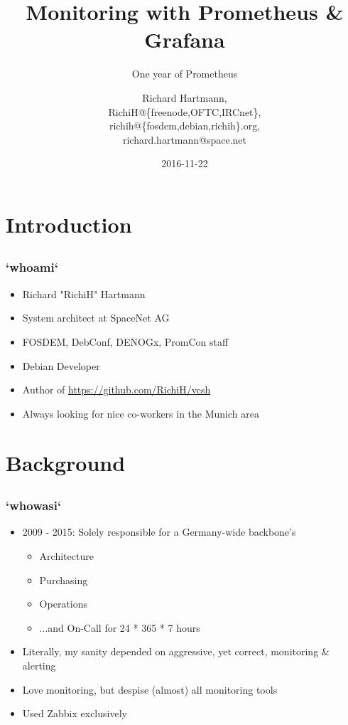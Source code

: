 \documentclass[t]{beamer}
\title{Monitoring with Prometheus \& Grafana}
\subtitle{One year of Prometheus}
\author{Richard Hartmann,\\
RichiH@\{freenode,OFTC,IRCnet\},\\
richih@\{fosdem,debian,richih\}.org,\\
richard.hartmann@space.net}
\date{2016-11-22}
\begin{document}
\setcounter{tocdepth}{1}

\begin{frame}
	\titlepage
\end{frame}


\section{Introduction}

\subsection{}

\begin{frame}
	\frametitle{`whoami`}
	\begin{itemize}
		\item Richard "RichiH" Hartmann
		\item System architect at SpaceNet AG
		\item FOSDEM, DebConf, DENOGx, PromCon staff
		\item Debian Developer
		\item Author of \url{https://github.com/RichiH/vcsh}
		\item Always looking for nice co-workers in the Munich area
	\end{itemize}
\end{frame}


\section{Background}

\subsection{}

\begin{frame}
	\frametitle{`whowasi`}
	\begin{itemize}
		\item 2009 - 2015: Solely responsible for a Germany-wide backbone's
		\begin{itemize}
			\item Architecture
			\item Purchasing
			\item Operations
			\item ...and On-Call for 24 * 365 * 7 hours
		\end{itemize}
		\item Literally, my sanity depended on aggressive, yet correct, monitoring \& alerting
		\item Love monitoring, but despise (almost) all monitoring tools
		\item Used Zabbix exclusively
	\end{itemize}
\end{frame}
\end{document}
